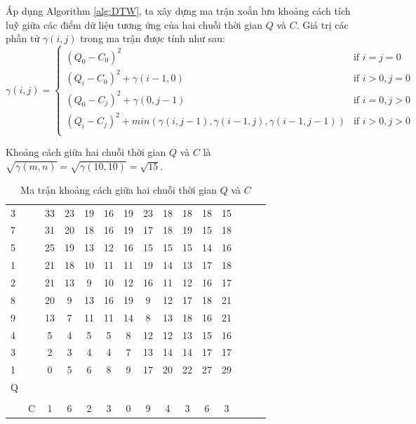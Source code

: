 \documentclass[13pt,oneside]{scrbook}
\begin{document}
Áp dụng Algorithm \ref{alg:DTW}, ta xây dựng ma trận xoắn lưu khoảng cách tích luỹ giữa các điểm dữ liệu tương ứng của hai chuỗi thời gian $Q$ và $C$.
Giá trị các phần tử $\gamma(i,j)$ trong ma trận được tính như sau:
\begin{equation}\label{eq.dtw}
\gamma(i, j) =
\begin{cases} 
      (Q_0 - C_0)^2 & \text{if $i = j = 0$} \\
      (Q_i - C_0)^2 + \gamma(i-1,0) & \text{if $i > 0, j = 0$} \\
       (Q_0 - C_j)^2 + \gamma(0, j-1) & \text{if $i = 0, j > 0$} \\
       (Q_i - C_j)^2 + min(\gamma(i, j-1), \gamma(i-1, j), \gamma(i-1, j-1)) & \text{if $i > 0, j > 0$} \\
   \end{cases}
\end{equation}

Khoảng cách giữa hai chuỗi thời gian $Q$ và $C$ là $\sqrt{\gamma(m,n)} = \sqrt{\gamma(10,10)} = \sqrt{15}$.
\begin{table}[!htb]
\centering
    \begin{tabular}{| c | c  c | c | c  | c | c | c | c | c | c | c | c | c | c | c |}
       \cline{1-1}\cline{4-13}
		3&&&33&23&19&16&19&23&18&18&18&\cellcolor{green}15\\
		\cline{1-1}\cline{4-13}
		7&&&31&20&18&16&19&17&18&19&\cellcolor{green}15&18\\
		\cline{1-1}\cline{4-13}
		5&&&25&19&13&12&16&15&15&15&\cellcolor{green}14&16\\
		\cline{1-1}\cline{4-13}
		1&&&21&18&10&11&11&19&14&\cellcolor{green}13&17&18\\ 
		\cline{1-1}\cline{4-13}
		2&&&21&13&9&10&12&16&\cellcolor{green}11&12&16&17\\
		\cline{1-1}\cline{4-13}
		8&&&20&9&13&16&19&\cellcolor{green}9&12&17&18&21\\ 
		\cline{1-1}\cline{4-13}
		9&&&13&7&11&11&14&\cellcolor{green}8&13&18&16&21\\
		\cline{1-1}\cline{4-13}
		4&&&5&4&5&5&\cellcolor{green}8&12&12&13&15&16\\
		\cline{1-1}\cline{4-13}
		3&&&2&\cellcolor{green}3&\cellcolor{green}4&\cellcolor{green}4&7&13&14&14&17&17\\
		\cline{1-1}\cline{4-13}
		1&&&\cellcolor{green}0&5&6&8&9&17&20&22&27&29\\ 
		\cline{1-1}\cline{4-13}
		\multicolumn{11}{l}{Q}\\
		\multicolumn{11}{l}{}\\
		\cline{4-13}
		\multicolumn{3}{r|}{C}&1&6&2&3&0&9&4&3&6&3\\
		\cline{4-13}
    \end{tabular}
    \caption{Ma trận khoảng cách giữa hai chuỗi thời gian $Q$ và $C$}\label{tab:dataset}
\end{table}
\end{document}
